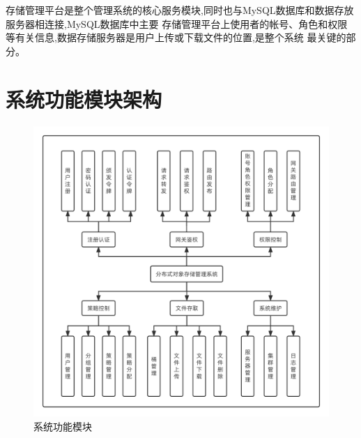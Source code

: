 
存储管理平台是整个管理系统的核心服务模块,同时也与MySQL数据库和数据存放服务器相连接,MySQL数据库中主要
存储管理平台上使用者的帐号、角色和权限等有关信息,数据存储服务器是用户上传或下载文件的位置,是整个系统
最关键的部分。

\section{系统功能模块架构}

\begin{figure}[h]
    \centering
    \includegraphics[width=1\textwidth]{my_figures/chapter4/系统功能模块.png}
    \caption{系统功能模块}
    \label{fig:系统功能模块}
\end{figure}



